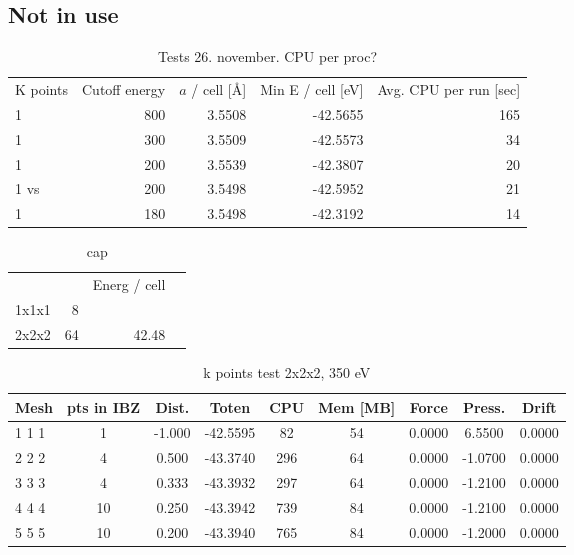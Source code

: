 \documentclass[11pt]{scrbook}   %
\begin{document}
\subsection{Not in use}

\begin{table}[htbp]
  \centering
  \begin{tabular}{lrrrr}
    K points    & Cutoff energy & $a$ / cell [\AA]   & Min E / cell [eV] & Avg. CPU per run [sec]      \\
    1           & 800           & 3.5508             & -42.5655          & 165      \\
    1           & 300           & 3.5509             & -42.5573          & 34       \\
    1           & 200           & 3.5539             & -42.3807          & 20       \\
    1 vs        & 200           & 3.5498             & -42.5952          & 21       \\
    1           & 180           & 3.5498             & -42.3192          & 14       \\
  \end{tabular}
  \caption{Tests 26. november. CPU per proc?}
\end{table}


\begin{table}[htbp]
  \centering
  \begin{tabular}{lrrr}
          &     & Energ / cell  \\
    1x1x1 &   8 &               \\
    2x2x2 &  64 & 42.48         \\
  \end{tabular}
  \caption{cap}
  \label{tab:supertests}
\end{table}


\begin{table}[htbp]
  \centering
  \begin{tabular}{lcccccccc}\toprule
    Mesh	& pts in IBZ    & Dist. & Toten     & CPU	& Mem [MB]  & Force	    & Press.	& Drift  \\\midrule
    1 1 1	&  1    	    &-1.000	& -42.5595	& 82	& 54        & 0.0000	& 6.5500	& 0.0000 \\
    2 2 2	&  4    	    & 0.500	& -43.3740	& 296	& 64        & 0.0000	& -1.0700	& 0.0000 \\
    3 3 3	&  4    	    & 0.333	& -43.3932	& 297   & 64        & 0.0000	& -1.2100	& 0.0000 \\
    4 4 4	& 10    	    & 0.250	& -43.3942	& 739	& 84        & 0.0000	& -1.2100	& 0.0000 \\
    5 5 5	& 10	        & 0.200	& -43.3940	& 765	& 84        & 0.0000	& -1.2000	& 0.0000 \\\bottomrule
  \end{tabular}
  \caption{k points test 2x2x2, 350 eV}
  \label{tab:ktest2}
\end{table}
\end{document}

